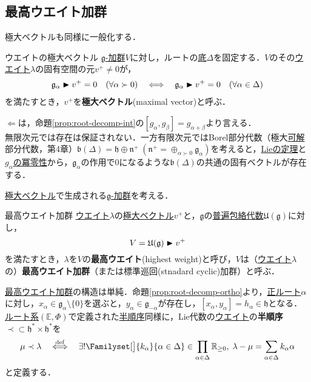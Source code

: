 \documentclass[rep_main]{subfiles}
\begin{document}
\subsection{最高ウエイト加群}
極大ベクトルも同様に一般化する．
\begin{mydef}[label=def:maximal-vector-rep]{ウエイトの極大ベクトル}
	\hyperref[ax:g-module]{$\mathfrak{g}$-加群}$V$に対し，ルートの\hyperref[def:base-root]{底}$\Delta$を固定する．$V$のその\hyperref[def:weight-rep]{ウエイト}$\lambda$の固有空間の元$v^+ \neq 0$が，
	\begin{align}
		\mathfrak{g}_\alpha \blacktriangleright v^+ = 0\quad  (\forall \alpha \succ 0)  \quad \Longleftrightarrow \quad  \mathfrak{g}_\alpha \blacktriangleright v^+ = 0\quad  (\forall \alpha \in \Delta)
	\end{align}
	を満たすとき，$v^+$を\textbf{極大ベクトル}(maximal vector)と呼ぶ．
\end{mydef}
$\Longleftarrow$は，命題\ref{prop:root-decomp-int}の$[g_\alpha, g_\beta] = g_{\alpha + \beta}$より言える．\\
無限次元では存在は保証されない．一方有限次元ではBorel部分代数（極大\hyperref[def:solvable-LieAlg]{可解}部分代数，第4章）$\mathfrak{b}(\Delta) = \mathfrak{h} \oplus \mathfrak{n}^+\ (\mathfrak{n}^+ = \oplus_{\alpha \succ 0} \mathfrak{g}_\alpha)$を考えると，\hyperref[thm:Lie]{Lieの定理}と\hyperref[root-decomp-basic1]{$g_\alpha$の冪零性}から，$\mathfrak{g}_\alpha$の作用で$0$になるような$\mathfrak{b}(\Delta)$の共通の固有ベクトルが存在する．

\hyperref[def:maximal-vector-rep]{極大ベクトル}で生成される\hyperref[ax:g-module]{$\mathfrak{g}$-加群}を考える．
\begin{mydef}[label=def:highest-weight-module]{最高ウエイト加群}
	\hyperref[def:weight-rep]{ウエイト}$\lambda$の\hyperref[def:maximal-vector-rep]{極大ベクトル}$v^+$と，$\mathfrak{g}$の\hyperref[def:univ-env-alg]{普遍包絡代数}$\mathfrak{U}(\mathfrak{g})$に対し，
	\begin{equation}
		V = \mathfrak{U}(\mathfrak{g}) \blacktriangleright v^+
	\end{equation}を満たすとき，$\lambda$を$V$の\textbf{最高ウエイト}(highest weight)と呼び，$V$は（\hyperref[def:weight-rep]{ウエイト}$\lambda$の）\textbf{最高ウエイト加群}（または標準巡回(stnadard cyclic)加群）と呼ぶ．
\end{mydef}
\hyperref[def:highest-weight-module]{最高ウエイト加群}の構造は単純．命題\ref{prop:root-decomp-ortho}より，\hyperref[def:base-root]{正ルート}$\alpha$に対し，$x_\alpha \in \mathfrak{g}_\alpha\setminus\{0\}$を選ぶと，$y_\alpha \in \mathfrak{g}_{-\alpha}$が存在し，$[x_\alpha, y_\alpha] = h_\alpha \in \mathfrak{h}$となる．\\
\hyperref[ax:root-system-2]{ルート系}$(\mathbb{E}, \Phi)$で定義された\hyperref[def:base-root,breakable]{半順序}同様に，Lie代数の\hyperref[def:weight-rep]{ウエイト}の\textbf{半順序}$\prec \subset \mathfrak{h}^* \times \mathfrak{h}^*$を
\begin{equation}
	\mu \prec \lambda  \DEF  \exists! \Familyset[\big]{k_\alpha}{\alpha \in \Delta} \in \prod_{\alpha \in \Delta} \mathbb{R}_{\ge 0},\; \lambda - \mu = \sum_{\alpha \in \Delta} k_\alpha \alpha
\end{equation}
と定義する．
\end{document}

